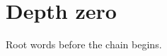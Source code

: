 \documentclass{article}
\begin{document}
\section{Depth zero}
Root words before the chain begins.

\end{document}
